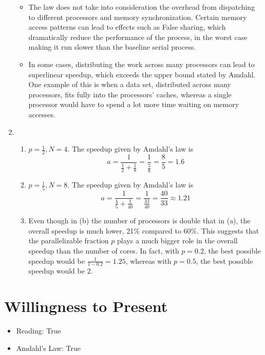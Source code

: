 \documentclass[12pt]{article}
\begin{document}
\begin{enumerate}[label=(\arabic*)]
  \begin{itemize}
  \item
    The law does not take into consideration the overhead from
    dispatching to different processors and memory synchronization.
    Certain memory access patterns can lead to effects such as
    False sharing, which dramatically reduce the performance of the
    process, in the worst case making it run slower than the baseline
    serial process.
  \item
    In some cases, distributing the work across many processors can lead
    to superlinear speedup, which exceeds the upper bound stated by
    Amdahl. One example of this is when a data set, distributed across
    many processors, fits fully into the processors' caches, whereas a
    single processor would have to spend a lot more time waiting on
    memory accesses.
  \end{itemize}
\item
  \begin{enumerate}
  \item
    \(p = \frac{1}{2},N = 4\). The speedup given by Amdahl's law is
    \[a = \frac{1}{\frac{1}{2} + \frac{1}{8}} = \frac{1}{\frac{5}{8}} = \frac{8}{5} = 1.6\]
  \item
    \(p = \frac{1}{5},N = 8\). The speedup given by Amdahl's law is
    \[a = \frac{1}{\frac{4}{5} + \frac{1}{40}} = \frac{1}{\frac{33}{40}} = \frac{40}{33} \approx 1.21\]
  \item
    Even though in (b) the number of processors is double that in (a),
    the overall speedup is much lower, 21\% compared to 60\%. This
    suggests that the parallelizable fraction \(p\) plays a much bigger
    role in the overall speedup than the number of cores. In fact, with
    \(p = 0.2\), the best possible speedup would be
    \(\frac{1}{1 - 0.2} = 1.25\), whereas with \(p = 0.5\), the best
    possible speedup would be \(2\).
  \end{enumerate}
\end{enumerate}

\section{Willingness to Present}
\begin{itemize}
    \item Reading: True
    \item Amdahl's Law: True
\end{itemize}
\end{document}
